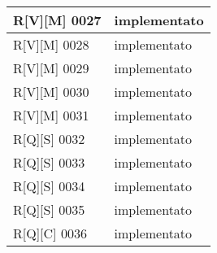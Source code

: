\begin{center}
\begin{longtable}{|p{3cm}|p{3cm}|}
    \hline
    R[V][M] 0027    & implementato  \\
    \hline
    R[V][M] 0028    & implementato  \\
    \hline
    R[V][M] 0029    & implementato  \\
    \hline
    R[V][M] 0030    & implementato  \\
    \hline
    R[V][M] 0031    & implementato  \\
    \hline
    R[Q][S] 0032    & implementato  \\
    \hline
    R[Q][S] 0033    & implementato  \\
    \hline
    R[Q][S] 0034    & implementato  \\
    \hline
    R[Q][S] 0035    & implementato  \\
    \hline
    R[Q][C] 0036    & implementato  \\
    \hline
    \end{longtable}
    \end{center}%

